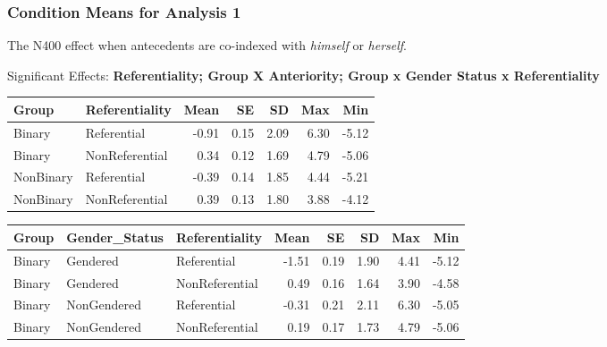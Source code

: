 \documentclass[
]{article}
\begin{document}
\subsubsection{Condition Means for Analysis
1}\label{condition-means-for-analysis-1}

The N400 effect when antecedents are co-indexed with \emph{himself} or
\emph{herself}.

Significant Effects: \textbf{Referentiality; Group X Anteriority; Group
x Gender Status x Referentiality}

\begin{longtable}[]{@{}llrrrrr@{}}
\toprule\noalign{}
Group & Referentiality & Mean & SE & SD & Max & Min \\
\midrule\noalign{}
\endhead
\bottomrule\noalign{}
\endlastfoot
Binary & Referential & -0.91 & 0.15 & 2.09 & 6.30 & -5.12 \\
Binary & NonReferential & 0.34 & 0.12 & 1.69 & 4.79 & -5.06 \\
NonBinary & Referential & -0.39 & 0.14 & 1.85 & 4.44 & -5.21 \\
NonBinary & NonReferential & 0.39 & 0.13 & 1.80 & 3.88 & -4.12 \\
\end{longtable}

\begin{longtable}[]{@{}lllrrrrr@{}}
\toprule\noalign{}
Group & Gender\_Status & Referentiality & Mean & SE & SD & Max & Min \\
\midrule\noalign{}
\endhead
\bottomrule\noalign{}
\endlastfoot
Binary & Gendered & Referential & -1.51 & 0.19 & 1.90 & 4.41 & -5.12 \\
Binary & Gendered & NonReferential & 0.49 & 0.16 & 1.64 & 3.90 &
-4.58 \\
Binary & NonGendered & Referential & -0.31 & 0.21 & 2.11 & 6.30 &
-5.05 \\
Binary & NonGendered & NonReferential & 0.19 & 0.17 & 1.73 & 4.79 &
-5.06 \\
\end{longtable}
\end{document}
